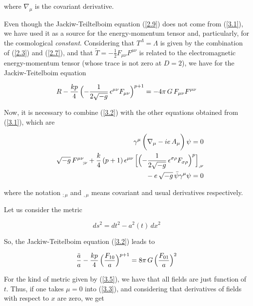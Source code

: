 \documentclass[a4paper,twocolumn,prd,groupedaddress,nofootinbib,showpacs]
{revtex4}
\begin{document}
\noindent
where $\nabla_\mu$ is the covariant derivative.

\medskip
Even though the Jackiw-Teiltelboim equation (\ref{2.9}) does not come
from (\ref{3.1}), we have used it as a source for the energy-momentum
tensor and, particularly, for the cosmological {\it constant}.
Considering that $T^\Lambda=\Lambda$ is given by the combination of
(\ref{2.3}) and (\ref{2.7}), and that $\tilde T=-\frac{1}{2}F_{\mu\nu}
F^{\mu\nu}$ is related to the electromagnetic energy-momentum tensor
(whose trace is not zero at $D=2$), we have for the Jackiw-Teitelboim
equation

\begin{equation}
R-\frac{kp}{4}\,
\Bigl(-\frac{1}{2\sqrt{-g}}\,\epsilon^{\mu\nu}F_{\mu\nu}\Bigr)^{p+1}
=-4\pi\,G\,F_{\mu\nu}F^{\mu\nu}
\label{3.2}
\end{equation}

Now, it is necessary to combine (\ref{3.2}) with the other equations
obtained from (\ref{3.1}), which are

\begin{eqnarray}
&&\gamma^\mu\,\biggl(\nabla_\mu-ie\,A_\mu\biggr)\,\psi=0
\label{3.3}\\
&&\sqrt{-g}\,F^{\mu\nu}_{\phantom{\mu\nu};\nu}
+\frac{k}{4}\,(p+1)\,\epsilon^{\mu\nu}\,
\Bigl[\Bigl(-\frac{1}{2\sqrt{-g}}\,
\epsilon^{\sigma\rho}F_{\sigma\rho}\Bigr)^p\Bigr]_{,\nu}
\nonumber\\
&&\phantom{\sqrt{-g}\,F^{\mu\nu}_{\phantom{\mu\nu};\nu}}
-e\,\sqrt{-g}\,\bar\psi\gamma^\mu\psi=0
\label{3.4}
\end{eqnarray}


\noindent
where the notation $_{;\mu}$ and $_{,\mu}$ means covariant and usual
derivatives respectively.

\medskip
Let us consider the metric

\begin{equation}
ds^2=dt^2-a^2(t)\,dx^2
\label{3.5}
\end{equation}

\noindent
So, the Jackiw-Teitelboim equation (\ref{3.2}) leads to

\begin{equation}
\frac{\ddot a}{a}
-\frac{kp}{4}\,\Bigl(\frac{F_{10}}{a}\Bigr)^{p+1}
=8\pi\,G\,\Bigl(\frac{F_{01}}{a}\Bigr)^2
\label{3.7}
\end{equation}


For the kind of metric given by (\ref{3.5}), we have that all fields
are just function of $t$. Thus, if one takes $\mu=0$ into (\ref{3.3}),
and considering that derivatives of fields with respect to $x$ are
zero, we get
\end{document}
